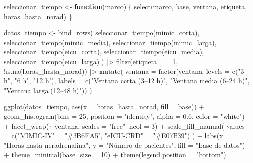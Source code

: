 \documentclass[
  spanish,
  a4paper,
  12pt,
  twoside]{memoir}
\newenvironment{Shaded}{\begin{snugshade}}{\end{snugshade}}
\newcommand{\AttributeTok}[1]{\textcolor[rgb]{0.40,0.45,0.13}{#1}}
\newcommand{\ControlFlowTok}[1]{\textcolor[rgb]{0.00,0.23,0.31}{\textbf{#1}}}
\newcommand{\DecValTok}[1]{\textcolor[rgb]{0.68,0.00,0.00}{#1}}
\newcommand{\FloatTok}[1]{\textcolor[rgb]{0.68,0.00,0.00}{#1}}
\newcommand{\FunctionTok}[1]{\textcolor[rgb]{0.28,0.35,0.67}{#1}}
\newcommand{\NormalTok}[1]{\textcolor[rgb]{0.00,0.23,0.31}{#1}}
\newcommand{\OtherTok}[1]{\textcolor[rgb]{0.00,0.23,0.31}{#1}}
\newcommand{\SpecialCharTok}[1]{\textcolor[rgb]{0.37,0.37,0.37}{#1}}
\newcommand{\StringTok}[1]{\textcolor[rgb]{0.13,0.47,0.30}{#1}}
\begin{document}
\begin{Shaded}
\begin{Highlighting}[]
\NormalTok{seleccionar\_tiempo }\OtherTok{\textless{}{-}} \ControlFlowTok{function}\NormalTok{(marco) \{}
  \FunctionTok{select}\NormalTok{(marco, base, ventana, etiqueta, horas\_hasta\_norad)}
\NormalTok{\}}

\NormalTok{datos\_tiempo }\OtherTok{\textless{}{-}} \FunctionTok{bind\_rows}\NormalTok{(}
  \FunctionTok{seleccionar\_tiempo}\NormalTok{(mimic\_corta),}
  \FunctionTok{seleccionar\_tiempo}\NormalTok{(mimic\_media),}
  \FunctionTok{seleccionar\_tiempo}\NormalTok{(mimic\_larga),}
  \FunctionTok{seleccionar\_tiempo}\NormalTok{(eicu\_corta),}
  \FunctionTok{seleccionar\_tiempo}\NormalTok{(eicu\_media),}
  \FunctionTok{seleccionar\_tiempo}\NormalTok{(eicu\_larga)}
\NormalTok{) }\SpecialCharTok{|\textgreater{}}
  \FunctionTok{filter}\NormalTok{(etiqueta }\SpecialCharTok{==} \DecValTok{1}\NormalTok{, }\SpecialCharTok{!}\FunctionTok{is.na}\NormalTok{(horas\_hasta\_norad)) }\SpecialCharTok{|\textgreater{}}
  \FunctionTok{mutate}\NormalTok{(}
    \AttributeTok{ventana =} \FunctionTok{factor}\NormalTok{(ventana, }\AttributeTok{levels =} \FunctionTok{c}\NormalTok{(}\StringTok{"3 h"}\NormalTok{, }\StringTok{"6 h"}\NormalTok{, }\StringTok{"12 h"}\NormalTok{),}
                     \AttributeTok{labels =} \FunctionTok{c}\NormalTok{(}\StringTok{"Ventana corta (3–12 h)"}\NormalTok{,}
                                \StringTok{"Ventana media (6–24 h)"}\NormalTok{,}
                                \StringTok{"Ventana larga (12–48 h)"}\NormalTok{))}
\NormalTok{  )}

\FunctionTok{ggplot}\NormalTok{(datos\_tiempo,}
       \FunctionTok{aes}\NormalTok{(}\AttributeTok{x =}\NormalTok{ horas\_hasta\_norad, }\AttributeTok{fill =}\NormalTok{ base)) }\SpecialCharTok{+}
  \FunctionTok{geom\_histogram}\NormalTok{(}\AttributeTok{bins =} \DecValTok{25}\NormalTok{, }\AttributeTok{position =} \StringTok{"identity"}\NormalTok{,}
                 \AttributeTok{alpha =} \FloatTok{0.6}\NormalTok{, }\AttributeTok{color =} \StringTok{"white"}\NormalTok{) }\SpecialCharTok{+}
  \FunctionTok{facet\_wrap}\NormalTok{(}\SpecialCharTok{\textasciitilde{}}\NormalTok{ ventana, }\AttributeTok{scales =} \StringTok{"free"}\NormalTok{, }\AttributeTok{ncol =} \DecValTok{3}\NormalTok{) }\SpecialCharTok{+}
  \FunctionTok{scale\_fill\_manual}\NormalTok{(}
    \AttributeTok{values =} \FunctionTok{c}\NormalTok{(}\StringTok{"MIMIC{-}IV"} \OtherTok{=} \StringTok{"\#3B6EA5"}\NormalTok{, }\StringTok{"eICU{-}CRD"} \OtherTok{=} \StringTok{"\#E07B39"}\NormalTok{)}
\NormalTok{  ) }\SpecialCharTok{+}
  \FunctionTok{labs}\NormalTok{(}\AttributeTok{x =} \StringTok{"Horas hasta noradrenalina"}\NormalTok{,}
       \AttributeTok{y =} \StringTok{"Número de pacientes"}\NormalTok{, }\AttributeTok{fill =} \StringTok{"Base de datos"}\NormalTok{) }\SpecialCharTok{+}
  \FunctionTok{theme\_minimal}\NormalTok{(}\AttributeTok{base\_size =} \DecValTok{10}\NormalTok{) }\SpecialCharTok{+}
  \FunctionTok{theme}\NormalTok{(}\AttributeTok{legend.position =} \StringTok{"bottom"}\NormalTok{)}
\end{Highlighting}
\end{Shaded}
\end{document}
